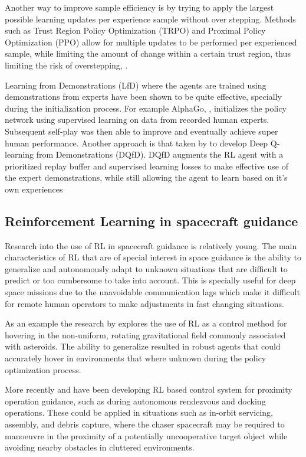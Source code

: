 \documentclass[12pt, english, NoHyper]{AE4010-template}
\begin{document}
Another way to improve sample efficiency is by trying to apply the largest possible learning updates per experience sample without over stepping. Methods such as Trust Region Policy Optimization (TRPO) and Proximal Policy Optimization (PPO) allow for multiple updates to be performed per experienced sample, while limiting the amount of change within a certain trust region, thus limiting the risk of overstepping, \cite{schulman2015trust, schulman2017proximal}.

Learning from Demonstrations (LfD) where the agents are trained using demonstrations from experts have been shown to be quite effective, specially during the initialization process. For example AlphaGo, \cite{silver2016mastering}, initializes the policy network using supervised learning on data from recorded human experts. Subsequent self-play was then able to improve and eventually achieve super human performance.
% 
Another approach is that taken by \cite{hester2018deep} to develop Deep Q-learning from Demonstrations (DQfD). DQfD augments the RL agent with a prioritized replay buffer and supervised learning losses to make effective use of the expert demonstrations, while still allowing the agent to learn based on it's own experiences 

\subsection{Reinforcement Learning in spacecraft guidance}
Research into the use of RL in spacecraft guidance is relatively young. The main characteristics of RL that are of special interest in space guidance is the ability to generalize and autonomously adapt to unknown situations that are difficult to predict or too cumbersome to take into account. This is specially useful for deep space missions due to the unavoidable communication lags which make it difficult for remote human operators to make adjustments in fast changing situations.

As an example the research by \cite{gaudet2012robust} explores the use of RL as a control method for hovering in the non-uniform, rotating gravitational field commonly associated with asteroids. The ability to generalize resulted in robust agents that could accurately hover in environments that where unknown during the policy optimization process.

More recently \cite{hovell2020deep, hovell2021deep} and \cite{broida2019spacecraft} have been developing RL based control system for proximity operation guidance, such as during autonomous rendezvous and docking operations. These could be applied in situations such as in-orbit servicing, assembly, and debris capture, where the chaser spacecraft may be required to manoeuvre in the proximity of a potentially uncooperative target object while avoiding nearby obstacles in cluttered environments. 
\end{document}
